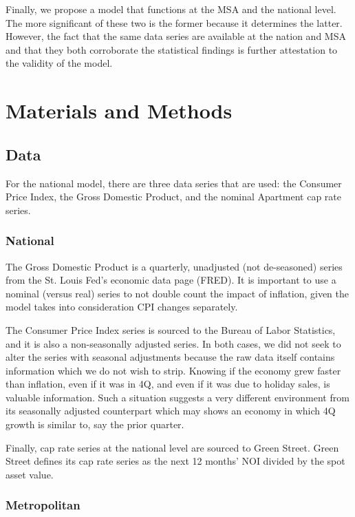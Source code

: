 \documentclass[jrfm,article,accept,oneauthor,pdftex]{Definitions/mdpi}
\begin{document}
Finally, we propose a model that functions at the MSA and the national level. The more significant of these two is the former because it determines the latter. However, the fact that the same data series are available at the nation and MSA and that they both corroborate the statistical findings is further attestation to the validity of the model.


\section{Materials and Methods}

\subsection{Data}
For the national model, there are three data series that are used: the Consumer Price Index, the Gross Domestic Product, and the nominal Apartment cap rate series. 

\subsubsection{National}
The Gross Domestic Product is a quarterly, unadjusted (not de-seasoned) series from the St. Louis Fed's economic data page (FRED). It is important to use a nominal (versus real) series to not double count the impact of inflation, given the model takes into consideration CPI changes separately.

The Consumer Price Index series is sourced to the Bureau of Labor Statistics, and it is also a non-seasonally adjusted series. In both cases, we did not seek to alter the series with seasonal adjustments because the raw data itself contains information which we do not wish to strip. Knowing if the economy grew faster than inflation, even if it was in 4Q, and even if it was due to holiday sales, is valuable information. Such a situation suggests a very different environment from its seasonally adjusted counterpart which may shows an economy in which 4Q growth is similar to, say the prior quarter.

Finally, cap rate series at the national level are sourced to Green Street. Green Street defines its cap rate series as the next 12 months' NOI divided by the spot asset value. 

\subsubsection{Metropolitan}
\end{document}
